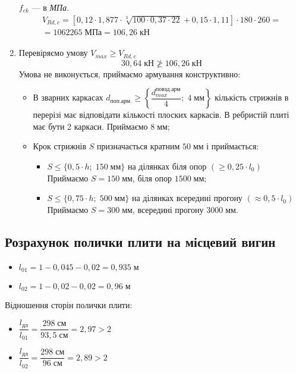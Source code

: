 \documentclass[a4paper,14pt]{article}
\begin{document}
\begin{enumerate}
        $f_{ck}$ --- в \textit{МПа}.
        \begin{multline*}
        V_{Rd,c} = \left[{0,12 \cdot 1,877 \cdot \sqrt[3]{100 \cdot 0,37 \cdot 22}} + 0,15 \cdot 1,11\right] \cdot 180 \cdot 260 =\\= 1062265\;\textit{МПа} = 106,26\;\textit{кН}
        \end{multline*}
    \item Перевіряємо умову $V_{max} \geq V_{Rd,c}$
        $$30,64\;\textit{кН} \ngeqslant 106,26\;\textit{кН}$$
        Умова не виконується, приймаємо армування конструктивно: 
        \begin{itemize}
            \item В зварних каркасах $d_{\textit{поп.арм.}}\geq \left\{\dfrac{d_{max}^{\textit{повзд.арм}}}{4};\;4\;\textit{мм}\right\}$ кількість стрижнів в перерізі має відповідати кількості плоских каркасів. В ребристій плиті має бути 2 каркаси. Приймаємо $8\;\textit{мм}$;
            \item Крок стрижнів $S$ призначається кратним $50\;\textit{мм}$ і приймається:
            \begin{itemize}
                \item $S \leq \{0,5 \cdot h;\;150\;\textit{мм}\}$ на ділянках біля опор $(\geq 0,25 \cdot l_0)$\\
                Приймаємо $S = 150\;\textit{мм}$, біля опор $1500\;\textit{мм}$;
                \item $S \leq \{0,75 \cdot h;\;500\;\textit{мм}\}$ на ділянках всередині прогону $(\approx 0,5 \cdot l_0)$\\
                Приймаємо $S = 300\;\textit{мм}$, всередині прогону $3000\;\textit{мм}$.
            \end{itemize}
        \end{itemize}
\end{enumerate}
\subsection{Розрахунок полички плити на місцевий вигин}
\begin{itemize}
    \item $l_{01} = 1 - 0,045 - 0,02 = 0,935\;\textit{м}$
    \item $l_{02} = 1 - 0,02 - 0,02 = 0,96\;\textit{м}$
\end{itemize}

Відношення сторін полички плити: 

\begin{itemize}
    \item $\dfrac{l_{\textit{дл}}}{l_{01}} = \dfrac{298\;\textit{см}}{93,5\;\textit{см}} = 2,97 > 2$
    \item $\dfrac{l_{\textit{дл}}}{l_{02}} = \dfrac{298\;\textit{см}}{96\;\textit{см}} = 2,89 > 2$
\end{itemize}
\end{document}
